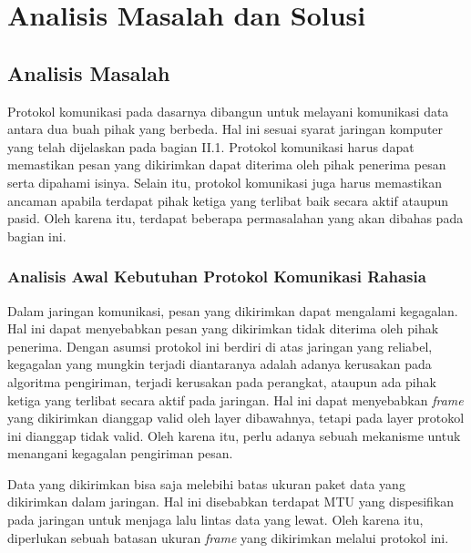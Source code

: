 

\chapter{Analisis Masalah dan Solusi}

\section{Analisis Masalah}

Protokol komunikasi pada dasarnya dibangun untuk melayani komunikasi data antara dua buah pihak yang berbeda. Hal ini sesuai syarat jaringan komputer yang telah dijelaskan pada bagian II.1. Protokol komunikasi harus dapat memastikan pesan yang dikirimkan dapat diterima oleh pihak penerima pesan serta dipahami isinya. Selain itu, protokol komunikasi juga harus memastikan ancaman apabila terdapat pihak ketiga yang terlibat baik secara aktif ataupun pasid. Oleh karena itu, terdapat beberapa permasalahan yang akan dibahas pada bagian ini.

\subsection{Analisis Awal Kebutuhan Protokol Komunikasi Rahasia}

Dalam jaringan komunikasi, pesan yang dikirimkan dapat mengalami kegagalan. Hal ini dapat menyebabkan pesan yang dikirimkan tidak diterima oleh pihak penerima. Dengan asumsi protokol ini berdiri di atas jaringan yang reliabel, kegagalan yang mungkin terjadi diantaranya adalah adanya kerusakan pada algoritma pengiriman, terjadi kerusakan pada perangkat, ataupun ada pihak ketiga yang terlibat secara aktif pada jaringan. Hal ini dapat menyebabkan \emph{frame} yang dikirimkan dianggap valid oleh layer dibawahnya, tetapi pada layer protokol ini dianggap tidak valid. Oleh karena itu, perlu adanya sebuah mekanisme untuk menangani kegagalan pengiriman pesan.

Data yang dikirimkan bisa saja melebihi batas ukuran paket data yang dikirimkan dalam jaringan. Hal ini disebabkan terdapat MTU yang dispesifikan pada jaringan untuk menjaga lalu lintas data yang lewat. Oleh karena itu, diperlukan sebuah batasan ukuran \emph{frame} yang dikirimkan melalui protokol ini.

